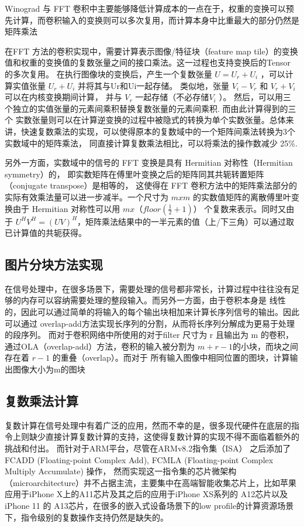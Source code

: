 Winograd 与 FFT 卷积中主要能够降低计算成本的一点在于，权重的变换可以预先计算，而卷积输入的变换则可以多次复用，而计算本身中比重最大的部分仍然是矩阵乘法

在FFT 方法的卷积实现中，需要计算表示图像/特征块（feature map tile）的变换值和权重的变换值的复数张量之间的接口乘法。这一过程也支持变换后的Tensor 的多次复用。
在执行图像块的变换后，产生一个复数张量 $U = U_r + U_i$ ，可以计算实值张量 $U_r + U_i$ 并将其与Ur和Ui一起存储。 类似地，张量 $V_i - V_r$ 和 $V_r + V_i$
 可以在内核变换期间计算， 并与 $V_r$ 一起存储（不必存储$V_i$ ）。 然后，可以用三个独立的实值张量的元素间乘积替换复数张量的元素间乘积. 而由此计算得到的三个
 实数张量则可以在计算逆变换的过程中被隐式的转换为单个实数张量。总体来讲，快速复数乘法的实现，可以使得原本的复数域中的一个矩阵间乘法转换为3个实数域中的矩阵乘法，
 同直接计算复数乘法相比，可以将乘法的操作数减少 25\%.

另外一方面，实数域中的信号的 FFT 变换是具有 Hermitian 对称性（Hermitian symmetry）的， 即实数矩阵在傅里叶变换之后的矩阵同其共轭转置矩阵（conjugate transpose）是相等的，
这使得在 FFT 卷积方法中的矩阵乘法部分的实际有效乘法量可以进一步减半。一个尺寸为 $m x m$ 的实数值矩阵的离散傅里叶变换由于 Hermitian 对称性可以用 $ m x （floor(\frac{1}{2} + 1)） $ 
个复数来表示。同时又由于 $ U^H V^H = ( UV )^H $，矩阵乘法结果中的一半元素的值（上/下三角）可以通过取已计算值的共轭获得。

\subsection{图片分块方法实现}
在信号处理中，在很多场景下，需要处理的信号都非常长，计算过程中往往没有足够的内存可以容纳需要处理的整段输入。而另外一方面，由于卷积本身是
线性的，因此可以通过简单的将输入的每个输出块相加来计算长序列信号的输出。因此可以通过 overlap-add方法实现长序列的分割，从而将长序列分解成为更易于处理的段序列。
而对于卷积网络中所使用的对于filter 尺寸为 r 且输出为 m 的卷积，通过OLA（overlap-add）方法，卷积的输入被分割为 $m + r - 1$的小块，而块之间存在着 $r-1$ 的重叠（overlap）。而对于
所有输入图像中相同位置的图块，计算输出图像大小为m的图块

\subsection{复数乘法计算}
复数计算在信号处理中有着广泛的应用，然而不幸的是，很多现代硬件在底层的指令上则缺少直接计算复数计算的支持，这使得复数计算的实现不得不面临着额外的挑战和付出。
而针对于ARM平台，尽管在ARMv8.2指令集（ISA） 之后添加了 FCADD (Floating-point Complex Add), FCMLA (Floating-point Complex Multiply Accumulate) 操作，
然而实现这一指令集的芯片微架构（microarchitecture）并不占据主流，主要集中在高端智能收集芯片上，比如苹果应用于iPhone X上的A11芯片及其之后的应用于iPhone XS系列的
A12芯片以及iPhone 11 的 A13芯片，在很多的嵌入式设备场景下的low profile的计算资源场景下，指令级别的复数操作支持仍然是缺失的。


